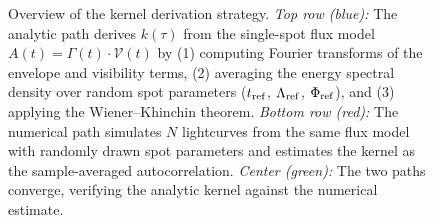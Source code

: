\begin{figure}[ht!]
\begin{tikzpicture}
\end{tikzpicture}
\caption{Overview of the kernel derivation strategy. \textit{Top row (blue):} The analytic path derives $k(\tau)$ from the single-spot flux model $A(t) = \Gamma(t)\cdot\mathcal{V}(t)$ by (1) computing Fourier transforms of the envelope and visibility terms, (2) averaging the energy spectral density over random spot parameters ($t_{\rm ref}$, $\Lambda_{\rm ref}$, $\Phi_{\rm ref}$), and (3) applying the Wiener--Khinchin theorem. \textit{Bottom row (red):} The numerical path simulates $N$ lightcurves from the same flux model with randomly drawn spot parameters and estimates the kernel as the sample-averaged autocorrelation. \textit{Center (green):} The two paths converge, verifying the analytic kernel against the numerical estimate.}
\label{fig:overview}
\end{figure}
